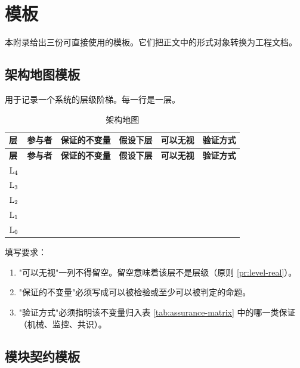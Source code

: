 \chapter{模板}\label{app:templates}

本附录给出三份可直接使用的模板。它们把正文中的形式对象转换为工程文档。

\section{架构地图模板}

用于记录一个系统的层级阶梯。每一行是一层。

{\small\begin{longtable}{L{1.1cm}L{2.2cm}L{2.9cm}L{2.5cm}L{2.6cm}L{2.3cm}}
\caption{架构地图}\label{tab:tpl-architecture}\\
\toprule
\textbf{层} & \textbf{参与者} & \textbf{保证的不变量} & \textbf{假设下层} &
\textbf{可以无视} & \textbf{验证方式} \\
\midrule
\endfirsthead
\toprule
\textbf{层} & \textbf{参与者} & \textbf{保证的不变量} & \textbf{假设下层} &
\textbf{可以无视} & \textbf{验证方式} \\
\midrule
\endhead
\bottomrule
\endlastfoot
$\mathrm{L}_{4}$ & & & & & \\
$\mathrm{L}_{3}$ & & & & & \\
$\mathrm{L}_{2}$ & & & & & \\
$\mathrm{L}_{1}$ & & & & & \\
$\mathrm{L}_{0}$ & & & & & \\
\end{longtable}}

填写要求：

\begin{enumerate}[label=(\arabic*)]
\item "可以无视"一列不得留空。留空意味着该层不是层级（原则 \ref{pr:level-real}）。
\item "保证的不变量"必须写成可以被检验或至少可以被判定的命题。
\item "验证方式"必须指明该不变量归入表 \ref{tab:assurance-matrix} 中的哪一类保证
      （机械、监控、共识）。
\end{enumerate}

\section{模块契约模板}

